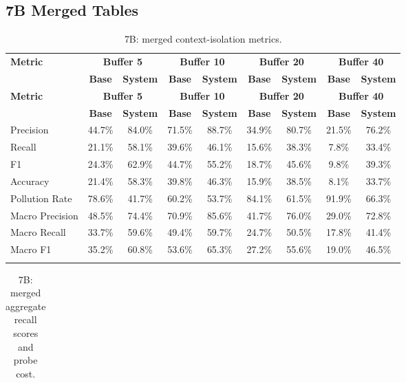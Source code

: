 \begin{landscape}
\subsection{7B Merged Tables}\label{app:7b_merged}
\tiny
\begin{longtable}{@{}p{3.8cm}cccccccc@{}}
\caption{7B: merged context-isolation metrics.}\label{tab:app_7b_context}\\

\toprule
\textbf{Metric} & \multicolumn{2}{c}{\textbf{Buffer 5}} & \multicolumn{2}{c}{\textbf{Buffer 10}} & \multicolumn{2}{c}{\textbf{Buffer 20}} & \multicolumn{2}{c}{\textbf{Buffer 40}} \\
\cmidrule(lr){2-3}\cmidrule(lr){4-5}\cmidrule(lr){6-7}\cmidrule(lr){8-9}
 & \textbf{Base} & \textbf{System} & \textbf{Base} & \textbf{System} & \textbf{Base} & \textbf{System} & \textbf{Base} & \textbf{System} \\
\midrule
\endfirsthead

\toprule
\textbf{Metric} & \multicolumn{2}{c}{\textbf{Buffer 5}} & \multicolumn{2}{c}{\textbf{Buffer 10}} & \multicolumn{2}{c}{\textbf{Buffer 20}} & \multicolumn{2}{c}{\textbf{Buffer 40}} \\
\cmidrule(lr){2-3}\cmidrule(lr){4-5}\cmidrule(lr){6-7}\cmidrule(lr){8-9}
 & \textbf{Base} & \textbf{System} & \textbf{Base} & \textbf{System} & \textbf{Base} & \textbf{System} & \textbf{Base} & \textbf{System} \\
\midrule
\endhead
Precision & 44.7\% & 84.0\% & 71.5\% & 88.7\% & 34.9\% & 80.7\% & 21.5\% & 76.2\% \\
Recall & 21.1\% & 58.1\% & 39.6\% & 46.1\% & 15.6\% & 38.3\% & 7.8\% & 33.4\% \\
F1 & 24.3\% & 62.9\% & 44.7\% & 55.2\% & 18.7\% & 45.6\% & 9.8\% & 39.3\% \\
Accuracy & 21.4\% & 58.3\% & 39.8\% & 46.3\% & 15.9\% & 38.5\% & 8.1\% & 33.7\% \\
Pollution Rate & 78.6\% & 41.7\% & 60.2\% & 53.7\% & 84.1\% & 61.5\% & 91.9\% & 66.3\% \\
Macro Precision & 48.5\% & 74.4\% & 70.9\% & 85.6\% & 41.7\% & 76.0\% & 29.0\% & 72.8\% \\
Macro Recall & 33.7\% & 59.6\% & 49.4\% & 59.7\% & 24.7\% & 50.5\% & 17.8\% & 41.4\% \\
Macro F1 & 35.2\% & 60.8\% & 53.6\% & 65.3\% & 27.2\% & 55.6\% & 19.0\% & 46.5\% \\
\botrule
\end{longtable}
\begin{longtable}{@{}p{3.8cm}cccccccc@{}}
\caption{7B: merged aggregate recall scores and probe cost.}\label{tab:app_7b_recall_agg}\\


\end{longtable}
\end{landscape}

